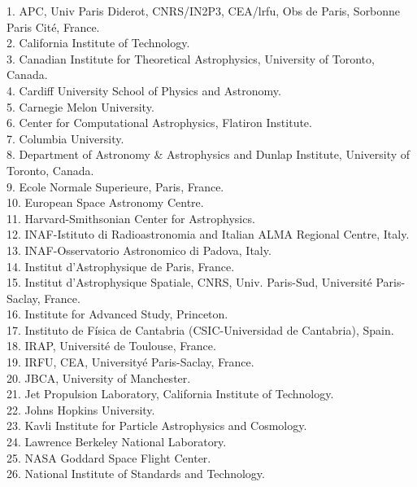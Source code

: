 \documentclass[PICOReport.tex]{subfiles}
\begin{document}
\begin{multicols}{2}
\raggedright 
\scriptsize {
1. APC, Univ Paris Diderot, CNRS/IN2P3, CEA/lrfu, Obs de Paris, Sorbonne Paris Cit\'e, France.  \\
2. California Institute of Technology.  \\
3. Canadian Institute for Theoretical Astrophysics, University of Toronto, Canada.  \\
4. Cardiff University School of Physics and Astronomy.  \\
5. Carnegie Melon University.  \\
6. Center for Computational Astrophysics, Flatiron Institute.  \\
7. Columbia University.  \\
8. Department of Astronomy \& Astrophysics and Dunlap Institute, University of Toronto, Canada.  \\
9. Ecole Normale Superieure, Paris, France.  \\
10. European Space Astronomy Centre.  \\
11. Harvard-Smithsonian Center for Astrophysics.  \\
12. INAF-Istituto di Radioastronomia and Italian ALMA Regional Centre, Italy.  \\
13. INAF-Osservatorio Astronomico di Padova, Italy.  \\
14. Institut d'Astrophysique de Paris, France.  \\
15. Institut d'Astrophysique Spatiale, CNRS, Univ. Paris-Sud, Universit\'e Paris-Saclay, France.  \\
16. Institute for Advanced Study, Princeton.  \\
17. Instituto de F\'isica de Cantabria (CSIC-Universidad de Cantabria), Spain.  \\
18. IRAP, Universit\'e de Toulouse, France.  \\
19. IRFU, CEA, University\'e Paris-Saclay, France.  \\
20. JBCA, University of Manchester.  \\
21. Jet Propulsion Laboratory, California Institute of Technology.  \\
22. Johns Hopkins University.  \\
23. Kavli Institute for Particle Astrophysics and Cosmology.  \\
24. Lawrence Berkeley National Laboratory.  \\
25. NASA Goddard Space Flight Center.  \\
26. National Institute of Standards and Technology.  \\
}
\end{multicols}
\end{document}
